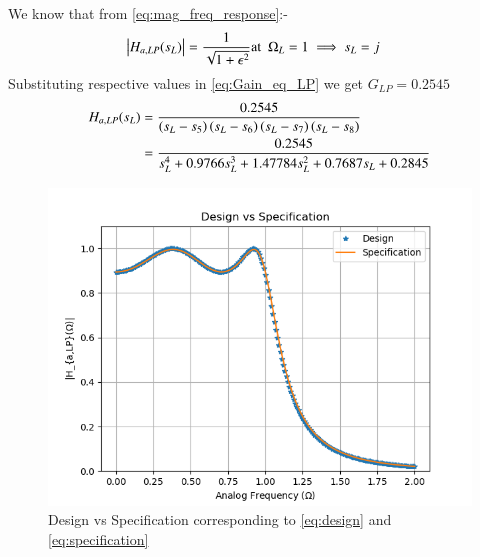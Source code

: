 \documentclass{article}
\begin{document}
\begin{enumerate}
We know that from \eqref{eq:mag_freq_response}:-
\begin{align}
    \left\vert H_{a,LP}(s_L)\right\vert &= \frac{1}{\sqrt{1+\epsilon^2}} \text{at} \hspace{5pt} \Omega_{L}=1 \implies s_{L} = j \label{eq:Gain_eq_LP} 
\end{align}
Substituting respective values in \eqref{eq:Gain_eq_LP} we get $G_{LP}=0.2545$
\begin{align}
     H_{a,LP}(s_L) &= \frac{0.2545}{\left(s_L-s_5\right)\left(s_L-s_6\right)\left(s_L-s_7\right)\left(s_L-s_8\right)}\\
     &= \frac{0.2545}{s_{L}^4 + 0.9766s_{L}^3 +1.47784s_{L}^2 + 0.7687s_{L} +0.2845}\label{eq:design}
\end{align}
\begin{figure}[H]
\centering
\includegraphics[width=1\columnwidth]{figs/Design_vs_Specification.png}
\caption{Design vs Specification corresponding to \eqref{eq:design} and \eqref{eq:specification}}
\label{fig:design_vs_specf}
\end{figure}


\end{enumerate}
\end{document}
